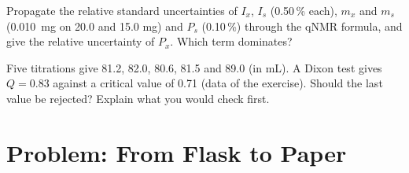 \begin{exercise}[$\star\star\star$]\label{exo:b3:lab-techniques-3:11}
Propagate the relative standard uncertainties of $I_x$, $I_s$ (0.50\,\% each), $m_x$ and $m_s$ (\qty{0.010}{mg} on 20.0
and 15.0 mg) and $P_s$ (0.10\,\%) through the qNMR formula, and give the relative uncertainty of $P_x$.
Which term dominates?
\end{exercise}

\begin{exercise}[$\star\star\star$]\label{exo:b3:lab-techniques-3:12}
Five titrations give 81.2, 82.0, 80.6, 81.5 and 89.0 (in mL). A Dixon test gives
$Q = 0.83$ against a critical value of 0.71 (data of the exercise). Should the last value be
rejected? Explain what you would check first.
\end{exercise}

\section{Problem: From Flask to Paper}

